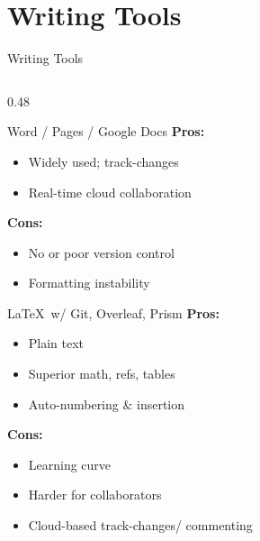 \documentclass{beamer}
\begin{document}
\section{Writing Tools}
\begin{frame}{Writing Tools}
    \fontsize{9pt}{8pt}\selectfont
    \begin{columns}[t]
        \begin{column}{0.48\textwidth}
            \begin{block}{Word / Pages / Google Docs}
                \textbf{Pros:}
                \begin{itemize}
                    \item Widely used; track-changes
                    \item Real-time cloud collaboration
                \end{itemize}
                \textbf{Cons:}
                \begin{itemize}
                    \item No or poor version control
                    \item Formatting instability
                \end{itemize}
            \end{block}
            
            \begin{block}{\LaTeX\ w/ Git, Overleaf, Prism}
                \textbf{Pros:}
                \begin{itemize}
                    \item Plain text
                    \item Superior math, refs, tables
                    \item Auto-numbering \& insertion
                \end{itemize}
                \textbf{Cons:}
                \begin{itemize}
                    \item Learning curve
                    \item Harder for collaborators
                    \item Cloud-based track-changes/ commenting
                \end{itemize}
            \end{block}
        \end{column}


\end{columns}
\end{frame}
\end{document}
